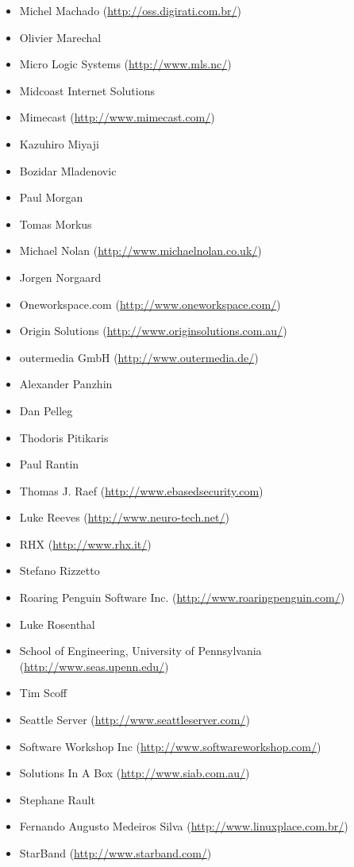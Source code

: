 \documentclass[a4paper,titlepage,12pt]{article}
\begin{document}
\begin{itemize}
	\item Michel Machado (\url{http://oss.digirati.com.br/})
	\item Olivier Marechal
	\item Micro Logic Systems (\url{http://www.mls.nc/})
	\item Midcoast Internet Solutions
	\item Mimecast (\url{http://www.mimecast.com/})
	\item Kazuhiro Miyaji
	\item Bozidar Mladenovic
	\item Paul Morgan
	\item Tomas Morkus
	\item Michael Nolan (\url{http://www.michaelnolan.co.uk/})
	\item Jorgen Norgaard
	\item Oneworkspace.com (\url{http://www.oneworkspace.com/})
	\item Origin Solutions (\url{http://www.originsolutions.com.au/})
	\item outermedia GmbH (\url{http://www.outermedia.de/})
	\item Alexander Panzhin
	\item Dan Pelleg
	\item Thodoris Pitikaris
	\item Paul Rantin
	\item Thomas J. Raef (\url{http://www.ebasedsecurity.com})
	\item Luke Reeves (\url{http://www.neuro-tech.net/})
	\item RHX (\url{http://www.rhx.it/})
	\item Stefano Rizzetto
	\item Roaring Penguin Software Inc. (\url{http://www.roaringpenguin.com/})
	\item Luke Rosenthal
	\item School of Engineering, University of Pennsylvania (\url{http://www.seas.upenn.edu/})
	\item Tim Scoff
	\item Seattle Server (\url{http://www.seattleserver.com/})
	\item Software Workshop Inc (\url{http://www.softwareworkshop.com/})
	\item Solutions In A Box (\url{http://www.siab.com.au/})
	\item Stephane Rault
	\item Fernando Augusto Medeiros Silva (\url{http://www.linuxplace.com.br/})
	\item StarBand (\url{http://www.starband.com/})

\end{itemize}
\end{document}
